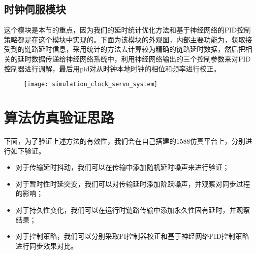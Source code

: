 \subsection{时钟伺服模块}
这个模块是本节的重点，因为我们的延时统计优化方法和基于神经网络的PID控制策略都是在这个模块中实现的。下面为该模块的外观图，内部主要功能为，获取接受到的链路延时信息，采用统计的方法去计算较为精确的链路延时数据，然后把相关的延时数据传递给神经网络系统中，利用神经网络输出的三个控制参数来对PID控制器进行调解，最后用pid对从时钟本地时钟的相位和频率进行校正。
\begin{figure}[!hbp]
  \centering
  \begin{minipage}[b]{1\textwidth}
    \captionstyle{\centering}
    \centering
    \texttt{[image: simulation\_clock\_servo\_system]}
  \end{minipage}     
\end{figure}

\section{算法仿真验证思路}
下面，为了验证上述方法的有效性，我们会在自己搭建的1588仿真平台上，分别进行如下验证。
\begin{itemize}[noitemsep,topsep=0pt,parsep=0pt,partopsep=0pt]
  \item 对于传输延时抖动，我们可以在传输中添加随机延时噪声来进行验证；
  \item 对于暂时性时延突变，我们可以对传输延时添加阶跃噪声，并观察对同步过程的影响；
  \item 对于持久性变化，我们可以在运行时链路传输中添加永久性固有延时，并观察结果；
  \item 对于控制策略，我们可以分别采取PI控制器校正和基于神经网络PID控制策略进行同步效果对比。
\end{itemize}

